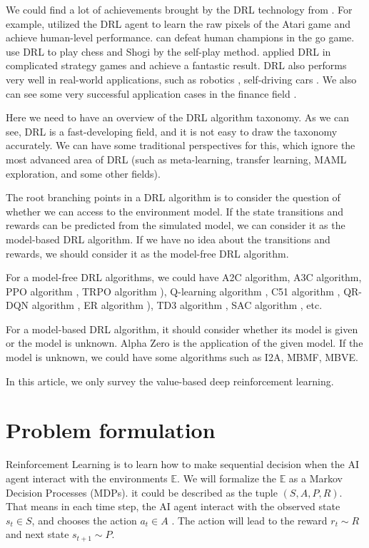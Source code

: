 \documentclass{article}
\begin{document}
We could find a lot of achievements brought by the DRL technology from \citep{lecun2015deep, schmidhuber2015deep, goodfellow2016deep}. For example, \citep{mnih2015human} utilized the DRL agent to learn the raw pixels of the Atari game and achieve human-level performance. \citep{silver2016mastering} can defeat human champions in the go game. \citep{silver2018general} use DRL to play chess and Shogi by the self-play method. \citep{vinyals2019alphastar} applied DRL in complicated strategy games and achieve a fantastic result. DRL also performs very well in real-world applications, such as robotics \citep{gandhi2017learning, pinto2017asymmetric}, self-driving cars \citep{pan2017virtual}. We also can see some very successful application cases in the finance field \citep{deng2016deep}. 

Here we need to have an overview of the DRL algorithm taxonomy. As we can see, DRL is a fast-developing field, and it is not easy to draw the taxonomy accurately. We can have some traditional perspectives for this, which ignore the most advanced area of DRL (such as meta-learning, transfer learning, MAML exploration, and some other fields).

The root branching points in a DRL algorithm is to consider the question of whether we can access to the environment model. If the state transitions and rewards can be predicted from the simulated model, we can consider it as the model-based DRL algorithm. If we have no idea about the transitions and rewards, we should consider it as the model-free DRL algorithm.

For a model-free DRL algorithms, we could have A2C algorithm, A3C algorithm\citep{mnih2016asynchronous}, PPO algorithm \citep{schulman2017proximal}, TRPO algorithm \citep{schulman2015trust}), Q-learning algorithm \citep{mnih2013playing}, C51 algorithm \citep{bellemare2017distributional}, QR-DQN algorithm \citep{dabney2018distributional}, ER algorithm \citep{andrychowicz2017hindsight}), TD3 algorithm \citep{fujimoto2018addressing}, SAC algorithm \citep{haarnoja2018soft}, etc.

For a model-based DRL algorithm, it should consider whether its model is given or the model is unknown. Alpha Zero \citep{silver2018general} is the application of the given model. If the model is unknown, we could have some algorithms such as I2A, MBMF, MBVE. 

In this article, we only survey the value-based deep reinforcement learning. 
%
\section{Problem formulation}
\label{sec:Problem formulation}
Reinforcement Learning \citep{sutton2018reinforcement} is to learn how to make sequential decision when the AI agent interact with the environments $\mathbb{E}$. We will formalize the $\mathbb{E}$ as a Markov Decision Processes (MDPs). it could be described as the tuple $({S},{A},{P},{R})$.  That means in each time step, the AI agent interact with the observed state $s_t \in {S}$, and chooses the action $a_t \in {A}$ . The action will lead to the reward $r_t \sim {R}$ and next state $s_{t+1} \sim {P}$.
\end{document}
